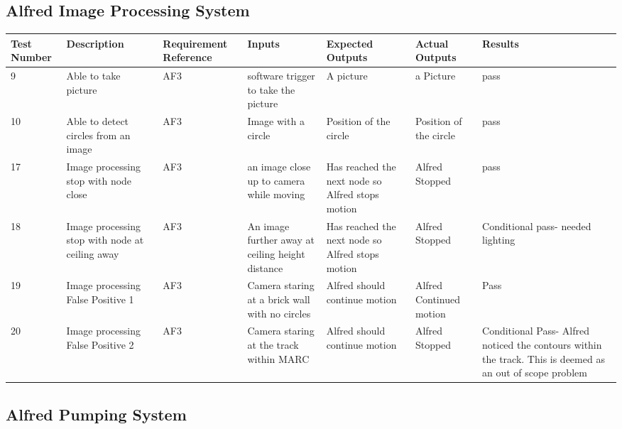 \documentclass [10pt]{article}
\begin{document}
\subsection {Alfred Image Processing System}
\begin{longtable}{| p{} | p{} | p{} | p{} | p{} | p{} | p{} |}\hline 
\rowcolor{tableCell}\textbf{Test Number} & \textbf{Description} & \textbf{Requirement Reference} & \textbf{Inputs} & \textbf{Expected Outputs} & \textbf{Actual Outputs}& \textbf{Results} \\ \hline

	9 &  Able to take picture &  AF3 & software trigger to take the picture &  A picture &  a Picture &  pass
\\ \hline
10 &  Able to detect circles from an image &  AF3 &  Image with a circle &  Position of the circle &  Position of the circle &  pass
\\ \hline
	17 &  Image processing stop with node close &  AF3 &  an image close up to camera while moving &  Has reached the next node so Alfred stops motion &  Alfred Stopped &  pass 
	\\ \hline
	18 &  Image processing stop with node at ceiling away &  AF3 &  An image further away at ceiling height distance &  Has reached the next node so Alfred stops motion &  Alfred Stopped &  Conditional pass- needed lighting
	\\ \hline
	19 &  Image processing False Positive 1 &  AF3 &  Camera staring at a brick wall with no circles &  Alfred should continue motion &  Alfred Continued motion &  Pass
	\\ \hline
	20 &  Image processing False Positive 2 &  AF3 &  Camera staring at the track within MARC &  Alfred should continue motion &  Alfred Stopped &  Conditional Pass- Alfred noticed the contours within the track. This is deemed as an out of scope problem
	\\ \hline
	\end{longtable}




\pagebreak

\subsection {Alfred Pumping System}
\end{document}
